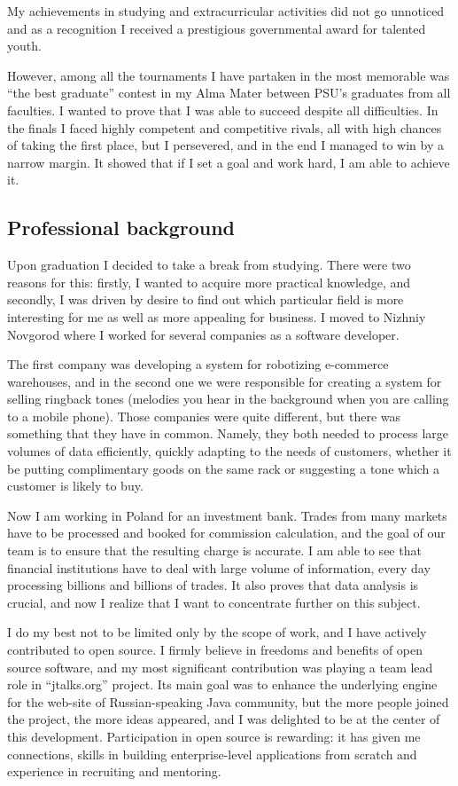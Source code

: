 \documentclass[a4paper,12pt]{article}
\begin{document}
My achievements in studying and extracurricular activities did not go unnoticed and as a recognition I received a prestigious governmental award for talented youth.

However, among all the tournaments I have partaken in the most memorable was ``the best graduate'' contest in my Alma Mater between PSU's graduates from all faculties. I wanted to prove that I was able to succeed despite all difficulties. In the finals I faced highly competent and competitive rivals, all with high chances of taking the first place, but I persevered, and in the end I managed to win by a narrow margin. It showed that if I set a goal and work hard, I am able to achieve it.


\subsection*{Professional background}

Upon graduation I decided to take a break from studying. There were two reasons for this: firstly, I wanted to acquire more practical knowledge, and secondly, I was driven by desire to find out which particular field is more interesting for me as well as more appealing for business. I moved to Nizhniy Novgorod where I worked for several companies as a software developer.

The first company was developing a system for robotizing e-commerce warehouses, and in the second one we were responsible for creating a system for selling ringback tones (melodies you hear in the background when you are calling to a mobile phone). Those companies were quite different, but there was something that they have in common. Namely, they both needed to process large volumes of data efficiently, quickly adapting to the needs of customers, whether it be putting complimentary goods on the same rack or suggesting a tone which a customer is likely to buy.

Now I am working in Poland for an investment bank. Trades from many markets have to be processed and booked for commission calculation, and the goal of our team is to ensure that the resulting charge is accurate. I am able to see that financial institutions have to deal with large volume of information, every day processing billions and billions of trades. It also proves that data analysis is crucial, and now I realize that I want to concentrate further on this subject.

I do my best not to be limited only by the scope of work, and I have actively contributed to open source. I firmly believe in freedoms and benefits of open source software, and my most significant contribution was playing a team lead role in ``jtalks.org'' project. Its main goal was to enhance the underlying engine for the web-site of Russian-speaking Java community, but the more people joined the project, the more ideas appeared, and I was delighted to be at the center of this development. Participation in open source is rewarding: it has given me connections, skills in building enterprise-level applications from scratch and experience in recruiting and mentoring.
\end{document}
